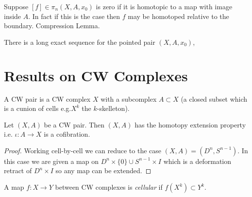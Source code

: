 \documentclass[12pt]{extarticle}
\begin{document}
\begin{remark}
Suppose $[f] \in \pi_n(X, A, x_0)$ is zero if it is homotopic to a map with image inside $A$. In fact if this is the case then $f$ may be homotoped relative to the boundary. Compression Lemma. 
\end{remark}

\begin{theorem}
There is a long exact sequence for the pointed pair $(X, A, x_0)$,
\begin{center}
\end{center}
\end{theorem}

\section{Results on CW Complexes}

\begin{definition}
A CW pair is a CW complex $X$ with a subcomplex $A \subset X$ (a closed subset which is a cunion of cells e.g.$X^k$ the $k$-skelleton). 
\end{definition}

\begin{theorem}
Let $(X, A)$ be a CW pair. Then $(X, A)$ has the homotopy extension property i.e. $\iota : A \to X$ is a cofibration. 
\end{theorem}

\begin{proof}
Working cell-by-cell we can reduce to the case $(X, A) = (D^n, S^{n-1})$. In this case we are given a map on $D^n \times \{ 0 \} \cup S^{n-1} \times I$ which is a deformation retract of $D^n \times I$ so any map can be extended. 
\end{proof}

\begin{definition}
A map $f : X \to Y$ between CW complexes is \textit{cellular} if $f(X^k) \subset Y^k$.
\end{definition}
\end{document}
